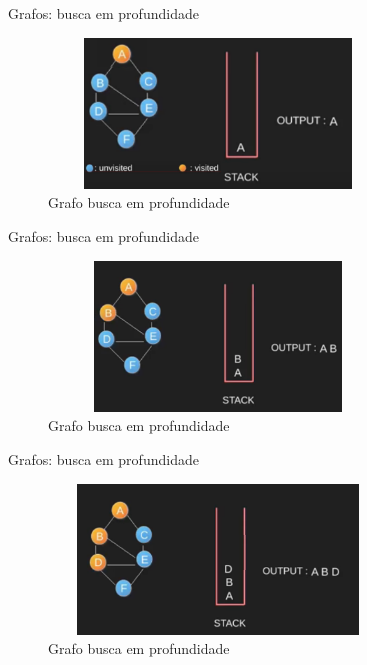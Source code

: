 \begin{frame}
	\begin{block}{Grafos: busca em profundidade}
		\begin{figure}[!htb]
			\centering	  
			\includegraphics[height=4cm, width = 9cm]{./pic/dfs2.png}
			\caption{Grafo busca em profundidade}
		\end{figure}
	\end{block}
\end{frame}

\begin{frame}
	\begin{block}{Grafos: busca em profundidade}
		\begin{figure}[!htb]
			\centering	  
			\includegraphics[height=4cm, width = 9cm]{./pic/dfs3.png}
			\caption{Grafo busca em profundidade}
		\end{figure}
	\end{block}
\end{frame}

\begin{frame}
	\begin{block}{Grafos: busca em profundidade}
		\begin{figure}[!htb]
			\centering	  
			\includegraphics[height=4cm, width = 9cm]{./pic/dfs4.png}
			\caption{Grafo busca em profundidade}
		\end{figure}
	\end{block}
\end{frame}

